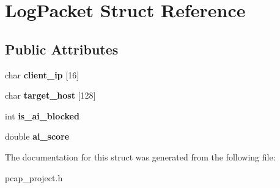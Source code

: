 \hypertarget{structLogPacket}{}\section{Log\+Packet Struct Reference}
\label{structLogPacket}
\subsection*{Public Attributes}
\begin{DoxyCompactItemize}
\item 
\mbox{\label{structLogPacket_a6effadb7ba05122cfbb71573ae9346d5}} 
char {\bfseries client\+\_\+ip} \mbox{[}16\mbox{]}
\item 
\mbox{\label{structLogPacket_a969134fa81f29e1b43f187ccfe43213f}} 
char {\bfseries target\+\_\+host} \mbox{[}128\mbox{]}
\item 
\mbox{\label{structLogPacket_abff9fc194d2b1700547b19bfee49cd4a}} 
int {\bfseries is\+\_\+ai\+\_\+blocked}
\item 
\mbox{\label{structLogPacket_a56b08431c35520338276a972b988f455}} 
double {\bfseries ai\+\_\+score}
\end{DoxyCompactItemize}


The documentation for this struct was generated from the following file\+:\begin{DoxyCompactItemize}
\item 
pcap\+\_\+project.\+h\end{DoxyCompactItemize}
